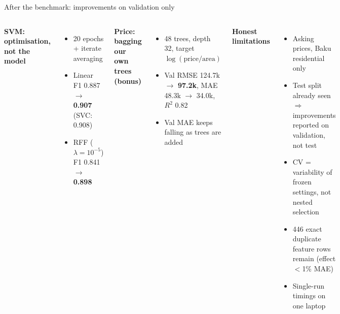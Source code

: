 \documentclass[aspectratio=169,11pt]{beamer}
\newcommand{\hi}[1]{\textcolor{accent}{\textbf{#1}}}
\begin{document}
\begin{frame}{After the benchmark: improvements on validation only}
  \begin{columns}[T]
    \textbf{SVM: optimisation, not the model}
    \begin{itemize}\small
      \item 20 epochs + iterate averaging
      \item Linear F1 0.887 $\to$ \hi{0.907} (SVC: 0.908)
      \item RFF ($\lambda{=}10^{-5}$) F1 0.841 $\to$ \hi{0.898}
    \end{itemize}
    \textbf{Price: bagging our own trees (bonus)}
    \begin{itemize}\small
      \item 48 trees, depth 32, target $\log(\text{price}/\text{area})$
      \item Val RMSE 124.7k $\to$ \hi{97.2k}, MAE 48.3k $\to$ 34.0k, $R^2$ 0.82
      \item Val MAE keeps falling as trees are added
    \end{itemize}
    \textbf{Honest limitations}
    \begin{itemize}\small
      \item Asking prices, Baku residential only
      \item Test split already seen $\Rightarrow$ improvements reported on validation, not test
      \item CV = variability of frozen settings, not nested selection
      \item 446 exact duplicate feature rows remain (effect $<$1\% MAE)
      \item Single-run timings on one laptop
    \end{itemize}
  \end{columns}
\end{frame}
\end{document}
